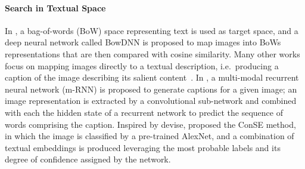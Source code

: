 \paragraph{Search in Textual Space}
In \cite{bai2014bag}, a bag-of-words (BoW) space representing text is used as target space, and a deep neural network called BowDNN is proposed to map images into BoWs representations that are then compared with cosine similarity.
Many other works focus on mapping images directly to a textual description, i.e.\ producing a caption of the image describing its salient content~\cite{vinyals2015show,karpathy2015deep,fang2015captions}.
In \cite{mao2014deep}, a multi-modal recurrent neural network (m-RNN) is proposed to generate captions for a given image;
an image representation is extracted by a convolutional sub-network and combined with each the hidden state of a recurrent network to predict the sequence of words comprising the caption.
Inspired by \gls{devise}, \citet{norouzi2013zero} proposed the ConSE method, in which the image is classified by a pre-trained AlexNet, and a combination of textual embeddings is produced leveraging the most probable labels and its degree of confidence assigned by the network.

